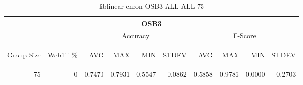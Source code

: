 \begin{center}
\begin{table}[htbp] 
 \begin{center}
\begin{tabular}{ | r | r | r | r | r | r | r | r | r | r |}
\hline
\multicolumn{10}{|c|}{OSB3}\\
\hline
 & & \multicolumn{4}{|c|}{Accuracy} & \multicolumn{4}{|c|}{F-Score}\\ \cline{3-10}
\begin{sideways}Group Size\end{sideways} & \begin{sideways}Web1T \%\end{sideways} & \begin{sideways}AVG\end{sideways} & \begin{sideways}MAX\end{sideways} & \begin{sideways}MIN\end{sideways} & \begin{sideways}STDEV\end{sideways} & \begin{sideways}AVG\end{sideways} & \begin{sideways}MAX\end{sideways} & \begin{sideways}MIN\end{sideways} & \begin{sideways}STDEV\end{sideways}\\
\hline
\multirow{0}{*}{75}
 & 0 & 0.7470 & 0.7931 & 0.5547 & 0.0862 & 0.5858 & 0.9786 & 0.0000 & 0.2703\\ \cline{2-10}
\hline
\end{tabular}
\caption{liblinear-enron-OSB3-ALL-ALL-75}
\label{table:liblinear-enron-OSB3-ALL-ALL-75}
\end{center}
 \end{table}
\end{center}


